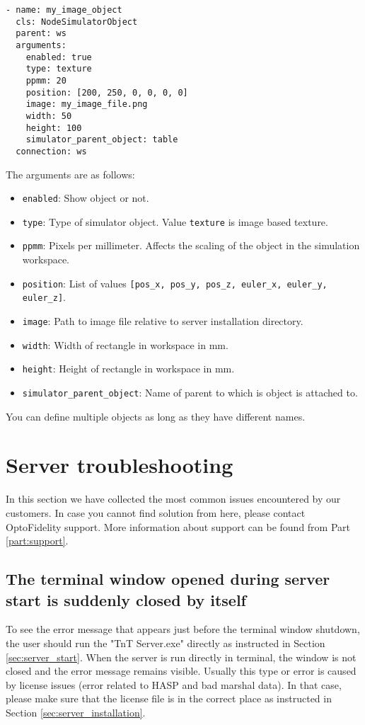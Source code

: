 \begin{lstlisting}
- name: my_image_object
  cls: NodeSimulatorObject
  parent: ws
  arguments:
    enabled: true
    type: texture
    ppmm: 20
    position: [200, 250, 0, 0, 0, 0]
    image: my_image_file.png
    width: 50
    height: 100
    simulator_parent_object: table
  connection: ws
\end{lstlisting}

The arguments are as follows:

\begin{itemize}
\item \texttt{enabled}: Show object or not.
\item \texttt{type}: Type of simulator object. Value \texttt{texture} is image based texture.
\item \texttt{ppmm}: Pixels per millimeter. Affects the scaling of the object in the simulation workspace.
\item \texttt{position}: List of values \texttt{[pos\_x, pos\_y, pos\_z, euler\_x, euler\_y, euler\_z]}.
\item \texttt{image}: Path to image file relative to server installation directory.
\item \texttt{width}: Width of rectangle in workspace in mm.
\item \texttt{height}: Height of rectangle in workspace in mm.
\item \texttt{simulator\_parent\_object}: Name of parent to which is object is attached to.
\end{itemize}

You can define multiple objects as long as they have different names.

\section{Server troubleshooting}
In this section we have collected the most common issues encountered by our customers. In case you cannot find solution from here, please contact OptoFidelity support. More information about support can be found from Part \ref{part:support}.

\subsection{The terminal window opened during server start is suddenly closed by itself}

To see the error message that appears just before the terminal window shutdown, the user should run the "TnT Server.exe" directly as instructed in Section \ref{sec:server_start}. When the server is run directly in terminal, the window is not closed and the error message remains visible. Usually this type or error is caused by license issues (error related to HASP and bad marshal data). In that case, please make sure that the license file is in the correct place as instructed in Section \ref{sec:server_installation}.

